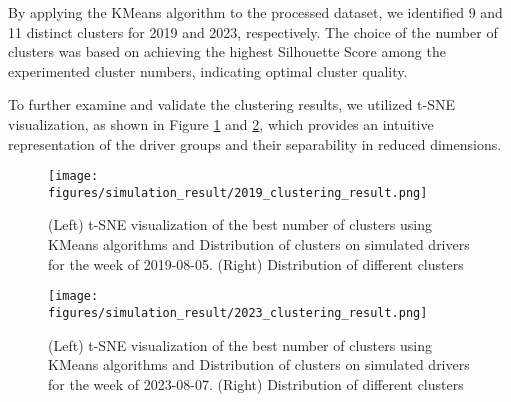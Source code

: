 By applying the KMeans algorithm to the processed dataset, we identified 9 and 11 distinct clusters for 2019 and 2023, respectively. The choice of the number of clusters was based on achieving the highest Silhouette Score among the experimented cluster numbers, indicating optimal cluster quality.

To further examine and validate the clustering results, we utilized t-SNE visualization, as shown in Figure \ref{figure:cluster_2019} and \ref{figure:cluster_2023}, which provides an intuitive representation of the driver groups and their separability in reduced dimensions.
\begin{figure}[h]
  \centering
  \texttt{[image: figures/simulation\_result/2019\_clustering\_result.png]}
  \caption{(Left) t-SNE visualization of the best number of clusters using KMeans algorithms and Distribution of clusters on simulated drivers for the week of 2019-08-05. (Right) Distribution of different clusters}
  \label{figure:cluster_2019}
\end{figure}

\begin{figure}[h]
  \centering
  \texttt{[image: figures/simulation\_result/2023\_clustering\_result.png]}
  \caption{(Left) t-SNE visualization of the best number of clusters using KMeans algorithms and Distribution of clusters on simulated drivers for the week of 2023-08-07. (Right) Distribution of different clusters}
  \label{figure:cluster_2023}
\end{figure}

